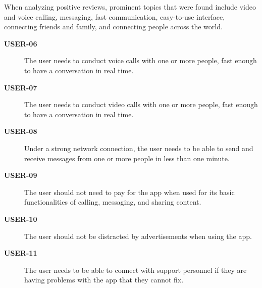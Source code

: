 When analyzing positive reviews, prominent topics that were found include
    video and voice calling,
    messaging,
    fast communication,
    easy-to-use interface,
    connecting friends and family,
    and connecting people across the world.

\begin{description}
    \item[\textbf{USER-06}]
        The user needs to conduct voice calls with one or more people, fast
            enough to have a conversation in real time.
    \item[\textbf{USER-07}]
        The user needs to conduct video calls with one or more people, fast
            enough to have a conversation in real time.
    \item[\textbf{USER-08}]
        Under a strong network connection, the user needs to be able to send and
            receive messages from one or more people in less than one minute.
    \item[\textbf{USER-09}]
        The user should not need to pay for the app when used for its basic
            functionalities of calling, messaging, and sharing content.
    \item[\textbf{USER-10}]
        The user should not be distracted by advertisements when using the app.
    \item[\textbf{USER-11}]
        The user needs to be able to connect with support personnel if they are
            having problems with the app that they cannot fix.
\end{description}
